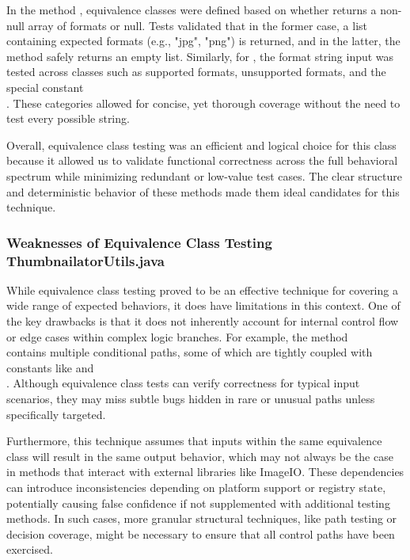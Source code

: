 \documentclass[12pt]{article}
\begin{document}
    In the method , equivalence classes were
        defined based on whether  returns a
        non-null array of formats or null.
    Tests validated that in the former case, a list containing expected formats
        (e.g., "jpg", "png") is returned, and in the latter, the method safely
        returns an empty list.
    Similarly, for , the format
        string input was tested across classes such as supported formats,
        unsupported formats, and the special constant\\
        .
    These categories allowed for concise, yet thorough coverage without the need
        to test every possible string.

    Overall, equivalence class testing was an efficient and logical choice for
        this class because it allowed us to validate functional correctness
        across the full behavioral spectrum while minimizing redundant or
        low-value test cases.
    The clear structure and deterministic behavior of these methods made them
        ideal candidates for this technique.

    \markboth{}{}
    \subsubsection{Weaknesses of Equivalence Class Testing ThumbnailatorUtils.java}
    \markboth{}{}

    While equivalence class testing proved to be an effective technique for
        covering a wide range of expected behaviors, it does have limitations in
        this context.
    One of the key drawbacks is that it does not inherently account for internal
        control flow or edge cases within complex logic branches.
    For example, the method\\
     contains
        multiple conditional paths, some of which are tightly coupled with
        constants like  and\\
        .
    Although equivalence class tests can verify correctness for typical input
        scenarios, they may miss subtle bugs hidden in rare or unusual paths
        unless specifically targeted.

    Furthermore, this technique assumes that inputs within the same equivalence
        class will result in the same output behavior, which may not always be
        the case in methods that interact with external libraries like ImageIO.
    These dependencies can introduce inconsistencies depending on platform
        support or registry state, potentially causing false confidence if not
        supplemented with additional testing methods.
    In such cases, more granular structural techniques, like path testing or
        decision coverage, might be necessary to ensure that all control paths
        have been exercised.
\end{document}
